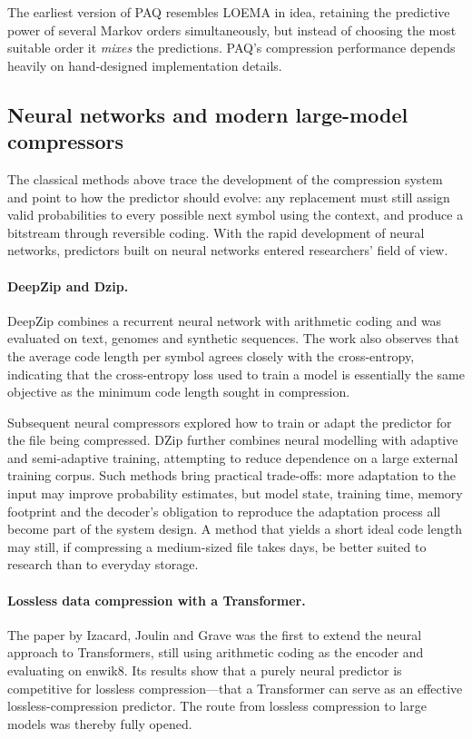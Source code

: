 \documentclass[12pt,a4paper]{article}
\begin{document}
The earliest version of PAQ resembles LOEMA in idea, retaining the predictive power of
several Markov orders simultaneously, but instead of choosing the most suitable order it
\emph{mixes} the predictions. PAQ's compression performance depends heavily on hand-designed
implementation details.

\subsection{Neural networks and modern large-model compressors}

The classical methods above trace the development of the compression system and point to how
the predictor should evolve: any replacement must still assign valid probabilities to every
possible next symbol using the context, and produce a bitstream through reversible coding.
With the rapid development of neural networks, predictors built on neural networks entered
researchers' field of view.

\paragraph{DeepZip and Dzip.}
DeepZip combines a recurrent neural network with arithmetic coding and was evaluated on text,
genomes and synthetic sequences. The work also observes that the average code length per
symbol agrees closely with the cross-entropy, indicating that the cross-entropy loss used to
train a model is essentially the same objective as the minimum code length sought in
compression.

Subsequent neural compressors explored how to train or adapt the predictor for the file being
compressed. DZip further combines neural modelling with adaptive and semi-adaptive training,
attempting to reduce dependence on a large external training corpus. Such methods bring
practical trade-offs: more adaptation to the input may improve probability estimates, but
model state, training time, memory footprint and the decoder's obligation to reproduce the
adaptation process all become part of the system design. A method that yields a short ideal
code length may still, if compressing a medium-sized file takes days, be better suited to
research than to everyday storage.

\paragraph{Lossless data compression with a Transformer.}
The paper by Izacard, Joulin and Grave was the first to extend the neural approach to
Transformers, still using arithmetic coding as the encoder and evaluating on enwik8. Its
results show that a purely neural predictor is competitive for lossless compression---that a
Transformer can serve as an effective lossless-compression predictor. The route from lossless
compression to large models was thereby fully opened.
\end{document}
